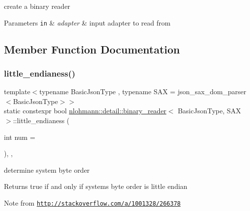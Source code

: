 create a binary reader 


\begin{DoxyParams}[1]{Parameters}
\mbox{\tt in}  & {\em adapter} & input adapter to read from \\
\hline
\end{DoxyParams}


\subsection{Member Function Documentation}
\mbox{\label{classnlohmann_1_1detail_1_1binary__reader_a1e31dbfcf9567c8c2d4f0e4eb1b0230a}} 
\subsubsection{\texorpdfstring{little\+\_\+endianess()}{little\_endianess()}}
{\footnotesize\ttfamily template$<$typename Basic\+Json\+Type , typename S\+AX  = json\+\_\+sax\+\_\+dom\+\_\+parser$<$\+Basic\+Json\+Type$>$$>$ \\
static constexpr bool \mbox{\hyperlink{classnlohmann_1_1detail_1_1binary__reader}{nlohmann\+::detail\+::binary\+\_\+reader}}$<$ Basic\+Json\+Type, S\+AX $>$\+::little\+\_\+endianess (\begin{DoxyParamCaption}\item[{int}]{num = {} }\end{DoxyParamCaption})\hspace{0.3cm}{\ttfamily [inline]}, {\ttfamily [static]}, {\ttfamily [noexcept]}}



determine system byte order 

\begin{DoxyReturn}{Returns}
true if and only if system\textquotesingle{}s byte order is little endian
\end{DoxyReturn}
\begin{DoxyNote}{Note}
from \href{http://stackoverflow.com/a/1001328/266378}{\tt http\+://stackoverflow.\+com/a/1001328/266378} 
\end{DoxyNote}
\mbox{\label{classnlohmann_1_1detail_1_1binary__reader_ab94a54d6e595c2620b07589cf4116256}} 
